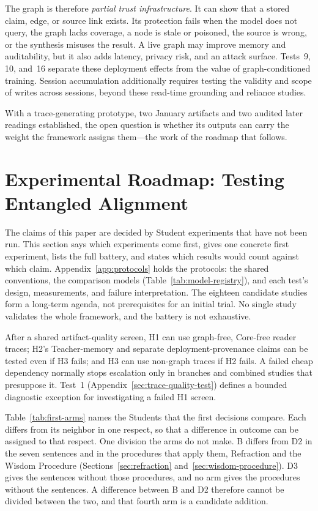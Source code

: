 \documentclass[11pt]{article}
\begin{document}
The graph is therefore \emph{partial trust infrastructure}. It can show that a
stored claim, edge, or source link exists. Its protection fails when the model
does not query, the graph lacks coverage, a node is stale or poisoned, the
source is wrong, or the synthesis misuses the result. A live graph may improve
memory and auditability, but it also adds latency, privacy risk, and an attack
surface. Tests~9, 10, and~16 separate these deployment effects from the value of
graph-conditioned training. Session accumulation additionally requires testing the validity and scope of
writes across sessions, beyond these read-time grounding and reliance studies.

With a trace-generating prototype, two January artifacts and two audited later
readings established, the
open question is whether its outputs can carry the weight the framework assigns
them---the work of the roadmap that follows.

\section{Experimental Roadmap: Testing Entangled Alignment}
\label{sec:experimental-roadmap}
\label{sec:experiments}


The claims of this paper are decided by Student experiments that have not been
run. This section says which experiments come first, gives one concrete first
experiment, lists the full battery, and states which results would count
against which claim. Appendix~\ref{app:protocols} holds the protocols: the
shared conventions, the comparison models
(Table~\ref{tab:model-registry}), and each test's design, measurements, and
failure interpretation. The eighteen candidate studies form a long-term
agenda, not prerequisites for an initial trial. No single study validates the
whole framework, and the battery is not exhaustive.

After a shared artifact-quality screen, H1 can use graph-free, Core-free reader
traces; H2's Teacher-memory and separate deployment-provenance claims can be
tested even if H3 fails; and H3 can use non-graph traces if H2 fails. A failed cheap
dependency normally stops escalation only in branches and combined studies that
presuppose it. Test~1 (Appendix~\ref{sec:trace-quality-test}) defines a
bounded diagnostic exception for investigating a failed H1 screen.

Table~\ref{tab:first-arms} names the Students that the first decisions
compare. Each differs from its neighbor in one respect, so that a difference in
outcome can be assigned to that respect. One division the arms do not make. B
differs from D2 in the seven sentences and in the procedures that apply them,
Refraction and the Wisdom Procedure (Sections~\ref{sec:refraction}
and~\ref{sec:wisdom-procedure}). D3 gives the sentences without those
procedures, and no arm gives the procedures without the sentences. A difference
between B and D2 therefore cannot be divided between the two, and that fourth
arm is a candidate addition.
\end{document}
